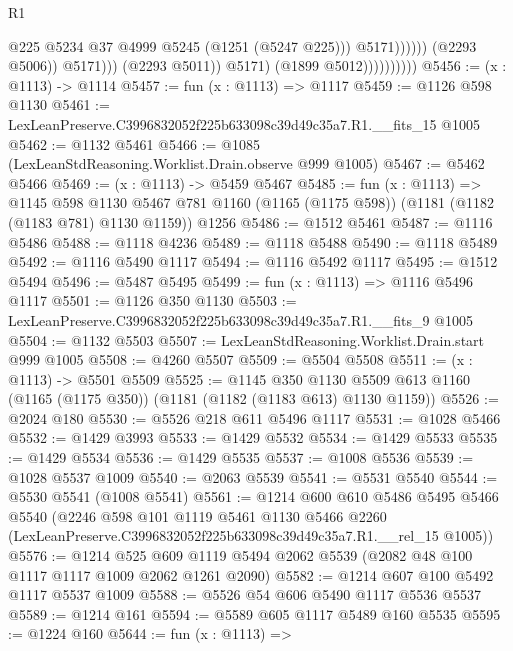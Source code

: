 \begin{lexlean}{R1}
\begin{coremodule}
                                                @225
                                                @5234
                                                @37
                                                @4999
                                                @5245
                                                (@1251 (@5247 @225)))
                                              @5171))))))
                                  (@2293 @5006))
                                @5171)))
                          (@2293 @5011))
                        @5171)
                      (@1899 @5012))))))))))
@5456 := (x : @1113) -> @1114
@5457 := fun (x : @1113) => @1117
@5459 := @1126 @598 @1130
@5461 := LexLeanPreserve.C3996832052f225b633098c39d49c35a7.R1.__fits_15 @1005
@5462 := @1132 @5461
@5466 := @1085 (LexLeanStdReasoning.Worklist.Drain.observe @999 @1005)
@5467 := @5462 @5466
@5469 := (x : @1113) -> @5459 @5467
@5485 := fun (x : @1113) =>
  @1145
    @598
    @1130
    @5467
    @781
    @1160
    (@1165 (@1175 @598))
    (@1181 (@1182 (@1183 @781) @1130 @1159))
    @1256
@5486 := @1512 @5461
@5487 := @1116 @5486
@5488 := @1118 @4236
@5489 := @1118 @5488
@5490 := @1118 @5489
@5492 := @1116 @5490 @1117
@5494 := @1116 @5492 @1117
@5495 := @1512 @5494
@5496 := @5487 @5495
@5499 := fun (x : @1113) => @1116 @5496 @1117
@5501 := @1126 @350 @1130
@5503 := LexLeanPreserve.C3996832052f225b633098c39d49c35a7.R1.__fits_9 @1005
@5504 := @1132 @5503
@5507 := LexLeanStdReasoning.Worklist.Drain.start @999 @1005
@5508 := @4260 @5507
@5509 := @5504 @5508
@5511 := (x : @1113) -> @5501 @5509
@5525 := @1145
    @350
    @1130
    @5509
    @613
    @1160
    (@1165 (@1175 @350))
    (@1181 (@1182 (@1183 @613) @1130 @1159))
@5526 := @2024 @180
@5530 := @5526 @218 @611 @5496 @1117
@5531 := @1028 @5466
@5532 := @1429 @3993
@5533 := @1429 @5532
@5534 := @1429 @5533
@5535 := @1429 @5534
@5536 := @1429 @5535
@5537 := @1008 @5536
@5539 := @1028 @5537 @1009
@5540 := @2063 @5539
@5541 := @5531 @5540
@5544 := @5530 @5541 (@1008 @5541)
@5561 := @1214
    @600
    @610
    @5486
    @5495
    @5466
    @5540
    (@2246
      @598
      @101
      @1119
      @5461
      @1130
      @5466
      @2260
      (LexLeanPreserve.C3996832052f225b633098c39d49c35a7.R1.__rel_15 @1005))
@5576 := @1214
    @525
    @609
    @1119
    @5494
    @2062
    @5539
    (@2082 @48 @100 @1117 @1117 @1009 @2062 @1261 @2090)
@5582 := @1214 @607 @100 @5492 @1117 @5537 @1009
@5588 := @5526 @54 @606 @5490 @1117 @5536 @5537
@5589 := @1214 @161
@5594 := @5589 @605 @1117 @5489 @160 @5535
@5595 := @1224 @160
@5644 := fun (x : @1113) =>

\end{coremodule}
\end{lexlean}
